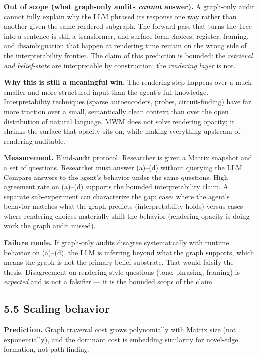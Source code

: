 \documentclass[12pt]{article}
\begin{document}
\textbf{Out of scope (what graph-only audits \emph{cannot} answer).} A graph-only audit cannot fully explain why the LLM phrased its response one way rather than another given the same rendered subgraph. The forward pass that turns the Tree into a sentence is still a transformer, and surface-form choices, register, framing, and disambiguation that happen at rendering time remain on the wrong side of the interpretability frontier. The claim of this prediction is bounded: the \emph{retrieval and belief-state} are interpretable by construction; the \emph{rendering layer} is not.

\textbf{Why this is still a meaningful win.} The rendering step happens over a much smaller and more structured input than the agent's full knowledge. Interpretability techniques (sparse autoencoders, probes, circuit-finding) have far more traction over a small, semantically clean context than over the open distribution of natural language. MWM does not solve rendering opacity; it shrinks the surface that opacity sits on, while making everything upstream of rendering auditable.

\textbf{Measurement.} Blind-audit protocol. Researcher is given a Matrix snapshot and a set of questions. Researcher must answer (a)--(d) without querying the LLM. Compare answers to the agent's behavior under the same questions. High agreement rate on (a)--(d) supports the bounded interpretability claim. A separate sub-experiment can characterize the gap: cases where the agent's behavior matches what the graph predicts (interpretability holds) versus cases where rendering choices materially shift the behavior (rendering opacity is doing work the graph audit missed).

\textbf{Failure mode.} If graph-only audits disagree systematically with runtime behavior on (a)--(d), the LLM is inferring beyond what the graph supports, which means the graph is not the primary belief substrate. That would falsify the thesis. Disagreement on rendering-style questions (tone, phrasing, framing) is \emph{expected} and is not a falsifier --- it is the bounded scope of the claim.

\subsection{5.5 Scaling behavior}\label{scaling-behavior}

\textbf{Prediction.} Graph traversal cost grows polynomially with Matrix size (not exponentially), and the dominant cost is embedding similarity for novel-edge formation, not path-finding.
\end{document}
